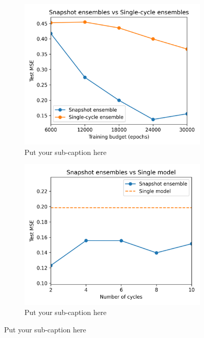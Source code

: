 \begin{figure}[ht]
	\begin{subfigure}{.5\textwidth}
		\centering
		\includegraphics[width=1\linewidth]{./figs/vary_b.png}  
		\caption{Put your sub-caption here}
		\label{fig:sub-first}
	\end{subfigure}
	\begin{subfigure}{.5\textwidth}
		\centering
		\includegraphics[width=1\linewidth]{./figs/vary_ac.png}  
		\caption{Put your sub-caption here}
		\label{fig:sub-second}
	\end{subfigure}

\end{figure}
